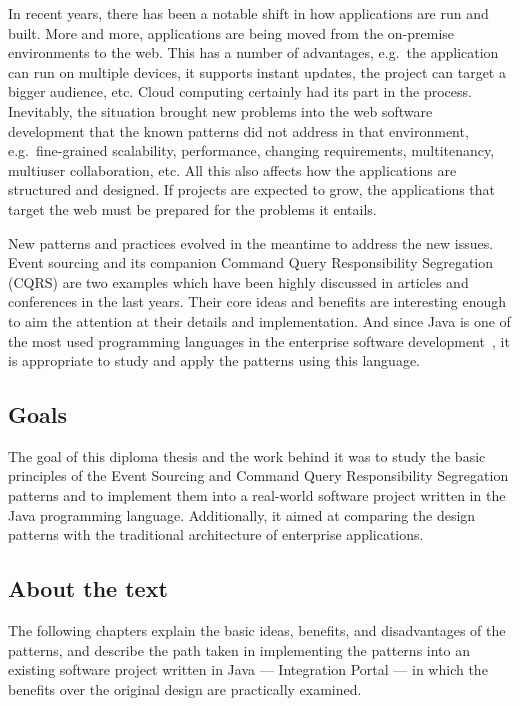 \documentclass{book}
\begin{document}
In recent years, there has been a notable shift in how applications are
run and built. More and more, applications are being moved from the
on-premise environments to the web. This has a number of advantages,
e.g.~the application can run on multiple devices, it supports instant
updates, the project can target a bigger audience, etc. Cloud computing
certainly had its part in the process. Inevitably, the situation brought
new problems into the web software development that the known patterns
did not address in that environment, e.g.~fine-grained scalability,
performance, changing requirements, multitenancy, multiuser
collaboration, etc. All this also affects how the applications are
structured and designed. If projects are expected to grow, the
applications that target the web must be prepared for the problems it
entails.

New patterns and practices evolved in the meantime to address the new
issues. Event sourcing and its companion Command Query Responsibility
Segregation (CQRS) are two examples which have been highly discussed in
articles and conferences in the last years. Their core ideas and
benefits are interesting enough to aim the attention at their details
and implementation. And since Java is one of the most used programming
languages in the enterprise software development~\cite{java}, it is
appropriate to study and apply the patterns using this language.

\subsection{Goals}\label{goals}

The goal of this diploma thesis and the work behind it was to study the
basic principles of the Event Sourcing and Command Query Responsibility
Segregation patterns and to implement them into a real-world software
project written in the Java programming language. Additionally, it aimed
at comparing the design patterns with the traditional architecture of
enterprise applications.

\subsection{About the text}\label{about-the-text}

The following chapters explain the basic ideas, benefits, and
disadvantages of the patterns, and describe the path taken in
implementing the patterns into an existing software project written in
Java --- Integration Portal --- in which the benefits over the original
design are practically examined.
\end{document}
